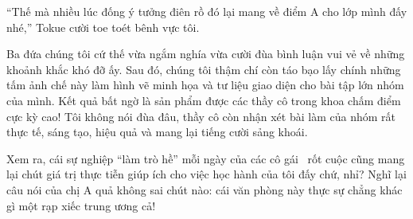 \documentclass[../main.tex]{subfiles}
\begin{document}
``Thế mà nhiều lúc đống ý tưởng điên rồ đó lại mang về điểm A cho lớp mình đấy nhé,'' Tokue cười toe toét bênh vực tôi.

Ba đứa chúng tôi cứ thế vừa ngắm nghía vừa cười đùa bình luận vui vẻ về những khoảnh khắc khó đỡ ấy. Sau đó, chúng tôi thậm chí còn táo bạo lấy chính những tấm ảnh chế này làm hình vẽ minh họa và tư liệu giao diện cho bài tập lớn nhóm của mình. Kết quả bất ngờ là sản phẩm được các thầy cô trong khoa chấm điểm cực kỳ cao! Tôi không nói đùa đâu, thầy cô còn nhận xét bài làm của nhóm rất thực tế, sáng tạo, hiệu quả và mang lại tiếng cười sảng khoái.

Xem ra, cái sự nghiệp ``làm trò hề'' mỗi ngày của các cô gái \hll\ rốt cuộc cũng mang lại chút giá trị thực tiễn giúp ích cho việc học hành của tôi đấy chứ, nhỉ? Nghĩ lại câu nói của chị A quả không sai chút nào: cái văn phòng này thực sự chẳng khác gì một rạp xiếc trung ương cả!
\end{document}
